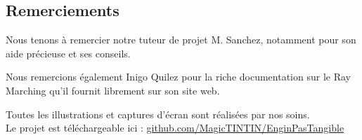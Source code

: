 \documentclass[a4paper,11pt,twoside]{article}
\begin{document}
\dosecttoc{} %
\clearpage

\thispagestyle{empty} %
\subsection*{Remerciements}
Nous tenons à remercier notre tuteur de projet M. Sanchez, notamment pour son aide précieuse et ses conseils. \\ \par
Nous remercions également Inigo Quilez pour la riche documentation sur le Ray Marching qu'il fournit librement sur son site web.
\clearpage

\thispagestyle{empty} %
\setcounter{secnumdepth}{3}
\tableofcontents
\clearpage

\setcounter{page}{1}



\clearpage

\clearpage

\clearpage

\clearpage


\clearpage
{}
\noindent
Toutes les illustrations et captures d'écran sont réalisées par nos soins.\\
Le projet est téléchargeable ici : \href{https://github.com/MagicTINTIN/EnginPasTangible}{github.com/MagicTINTIN/EnginPasTangible}\\


\clearpage

\clearpage
\appendix
\renewcommand{\stctitle}{}                          %
\renewcommand\thesubsection{A\arabic{subsection}}   %
\renewcommand{\stcSSfont}{}                         %

\secttoc
\clearpage
{}




\end{document}

